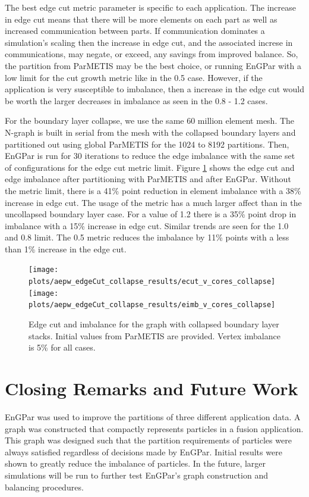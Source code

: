 \documentclass[conference]{IEEEtran}
\begin{document}
The best edge cut metric parameter is specific to each application. The increase in
edge cut means that there will be more elements on each part as well as
increased communication
between parts. If communication dominates a simulation's scaling then the increase in
edge cut, and the associated increse in communications, may negate, or exceed,
any savings from improved balance. So, the partition from ParMETIS may
be the best choice, or running EnGPar with a low limit for the cut growth metric like in the
0.5 case. However, if the application is very susceptible to imbalance, then a increase in the
edge cut would be worth the larger decreases in imbalance as seen in the 0.8 - 1.2 cases.

For the boundary layer collapse, we use the same 60 million element mesh. The N-graph is
built in serial from the mesh with the collapsed boundary layers and partitioned
out using global ParMETIS for the 1024 to 8192 partitions.
Then, EnGPar is run for 30 iterations to reduce the edge imbalance with the same set of
configurations for the edge cut metric limit. Figure \ref{fig:collapse}
shows the edge cut and edge imbalance after partitioning with
ParMETIS and after EnGPar. Without the metric limit, there is a 41\% point reduction in
element imbalance with a 38\% increase in edge cut. The usage of the metric has a much larger
affect than in the uncollapsed boundary layer case. For a value of 1.2 there is a 35\% point
drop in imbalance with a 15\% increase in edge cut. Similar trends are seen for the 1.0 and 0.8
limit. The 0.5 metric reduces the imbalance by 11\% points with a less than 1\% increase in the
edge cut.


\begin{figure}[!ht]
  \centering
  \texttt{[image: plots/aepw\_edgeCut\_collapse\_results/ecut\_v\_cores\_collapse]}
  \texttt{[image: plots/aepw\_edgeCut\_collapse\_results/eimb\_v\_cores\_collapse]}
  \caption{Edge cut and imbalance for the graph with collapsed boundary layer stacks. Initial values from ParMETIS are provided. Vertex imbalance is 5\% for all cases.}
  \label{fig:collapse}
\end{figure}

\section{Closing Remarks and Future Work} \label{sec:closing}


EnGPar was used to improve the partitions of three different application data. A
graph was constructed that compactly represents particles in a fusion application. This
graph was designed such that the partition requirements of particles were always satisfied
regardless of decisions made by EnGPar.
Initial results were
shown to greatly reduce the imbalance of particles. In the future, larger simulations will
be run to further test EnGPar's graph construction and balancing procedures.
\end{document}
